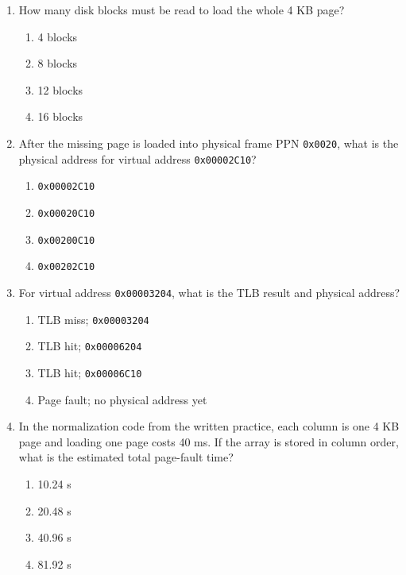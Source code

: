 \documentclass[a4paper,12pt]{article}
\begin{document}
\begin{enumerate}[label=\textbf{\arabic*.}]
    \item How many disk blocks must be read to load the whole 4 KB page?
    \begin{enumerate}[label=\alph*)]
        \item 4 blocks
        \item 8 blocks
        \item 12 blocks
        \item 16 blocks
    \end{enumerate}

    \item After the missing page is loaded into physical frame PPN \texttt{0x0020}, what is the physical address for virtual address \texttt{0x00002C10}?
    \begin{enumerate}[label=\alph*)]
        \item \texttt{0x00002C10}
        \item \texttt{0x00020C10}
        \item \texttt{0x00200C10}
        \item \texttt{0x00202C10}
    \end{enumerate}

    \item For virtual address \texttt{0x00003204}, what is the TLB result and physical address?
    \begin{enumerate}[label=\alph*)]
        \item TLB miss; \texttt{0x00003204}
        \item TLB hit; \texttt{0x00006204}
        \item TLB hit; \texttt{0x00006C10}
        \item Page fault; no physical address yet
    \end{enumerate}

    \item In the normalization code from the written practice, each column is one 4 KB page and loading one page costs 40 ms. If the array is stored in column order, what is the estimated total page-fault time?
    \begin{enumerate}[label=\alph*)]
        \item 10.24 s
        \item 20.48 s
        \item 40.96 s
        \item 81.92 s
    \end{enumerate}
\end{enumerate}
\end{document}
